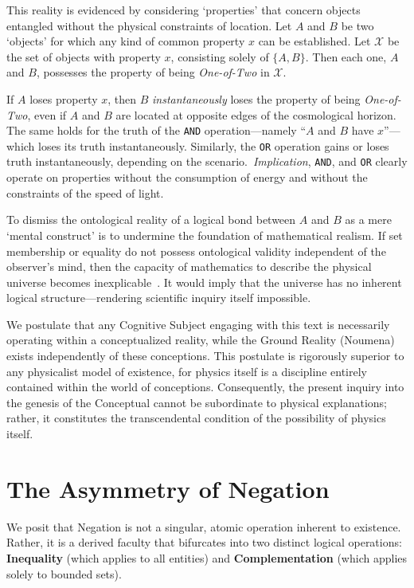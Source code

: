 \documentclass[11pt, a4paper]{article}
\theoremstyle{formalism}
\begin{document}
This reality is evidenced by considering `properties' that concern objects
entangled without the physical constraints of location. Let $A$ and $B$ be two
`objects' for which any kind of common property $x$ can be established. Let
$\mathcal{X}$ be the set of objects with property $x$, consisting solely of
$\{A, B\}$. Then each one, $A$ and $B$, possesses the property of being
\textit{One-of-Two} in $\mathcal{X}$.

If $A$ loses property $x$, then $B$ \textit{instantaneously} loses the property
of being \textit{One-of-Two}, even if $A$ and $B$ are located at opposite edges
of the cosmological horizon. The same holds for the truth of the \texttt{AND}
operation---namely ``$A$ and $B$ have $x$''---which loses its truth
instantaneously. Similarly, the \texttt{OR} operation gains or loses truth
instantaneously, depending on the scenario.\ \textit{Implication}, \texttt{AND},
and \texttt{OR} clearly operate on properties without the consumption of energy
and without the constraints of the speed of light.

To dismiss the ontological reality of a logical bond between $A$ and $B$ as a
mere `mental construct' is to undermine the foundation of mathematical realism.
If set membership or equality do not possess ontological validity independent
of the observer's mind, then the capacity of mathematics to describe the
physical universe becomes inexplicable~\cite{Wigner1960}. It would imply that
the universe has no inherent logical structure---rendering scientific inquiry
itself impossible.

We postulate that any Cognitive Subject engaging with this text is necessarily
operating within a conceptualized reality, while the Ground Reality (Noumena)
exists independently of these conceptions. This postulate is rigorously superior
to any physicalist model of existence, for physics itself is a discipline
entirely contained within the world of conceptions. Consequently, the present
inquiry into the genesis of the Conceptual cannot be subordinate to physical
explanations; rather, it constitutes the transcendental condition of the
possibility of physics itself.

\section{The Asymmetry of Negation}

We posit that Negation is not a singular, atomic operation inherent to existence. Rather, it is a derived faculty that bifurcates into two distinct logical operations: \textbf{Inequality} (which applies to all entities) and \textbf{Complementation} (which applies solely to bounded sets).
\end{document}
